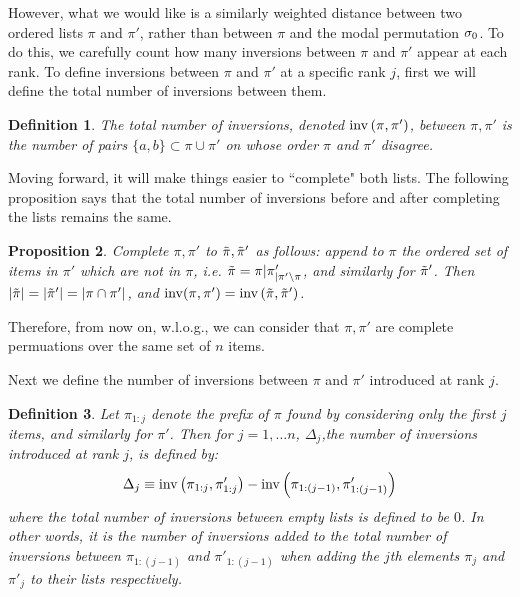 \documentclass[10pt]{article}
\newtheorem{prop}{Proposition}
\newtheorem{definition}[prop]{Definition}
\newcommand\bl{\left(}
\newcommand\br{\right)}
\begin{document}
However, what we would like is a similarly weighted distance between two ordered lists $\pi$ and $\pi'$, rather than between $\pi$ and the modal permutation $\sigma_0$. To do this, we carefully count how many inversions between $\pi$ and $\pi'$ appear at each rank. To define inversions between $\pi$ and $\pi'$ at a specific rank $j$, first we will define the total number of inversions between them.

\begin{definition}
The total number of inversions, denoted $\inv\bl \pi, \pi' \br$, between $\pi,\pi'$ is the number of pairs $\{a,b\}\subset \pi \cup \pi'$ on whose order $\pi$ and $\pi'$ disagree. 
\end{definition}

Moving forward, it will make things easier to ``complete" both lists. The following proposition says that the total number of inversions before and after completing the lists remains the same.

\begin{prop}
    Complete $\pi,\pi'$ to $\tilde{\pi},\tilde{\pi}'$ as follows: append to $\pi$ the ordered set of items in $\pi'$ which are not in $\pi$, i.e. $\tilde{\pi}=\pi|\pi'_{|\pi'\setminus\pi}$, and similarly for $\tilde{\pi}'$. Then $|\tilde{\pi}|=|\tilde{\pi}'|=|\pi \cap \pi'|$, and $\inv(\pi,\pi') = \inv \bl \tilpi,\tilpi' \br$.
\end{prop}

Therefore, from now on, w.l.o.g., we can consider that $\pi,\pi'$ are complete permuations over the same set of $n$ items.

Next we define the number of inversions between $\pi$ and $\pi'$ introduced at rank $j$. 

\begin{definition}
    Let $\pi_{1:j}$ denote the prefix of $\pi$ found by considering only the first $j$ items, and similarly for $\pi'$. Then for $j=1, \ldots n$, $\Delta_j$,the number of inversions introduced at rank $j$, is defined by:
    \begin{equation}
        \Delta_j \equiv \inv \bl \pi_{1:j},\pi'_{1:j}\br - \inv \bl \pi_{1:(j-1)},\pi'_{1:(j-1)}\br
    \end{equation}
    where the total number of inversions between empty lists is defined to be $0$.
    In other words, it is the number of inversions added to the total number of inversions between $\pi_{1:(j-1)}$ and $\pi'_{1:(j-1)}$ when adding the $j$th elements $\pi_j$ and $\pi'_j$ to their lists respectively.
\end{definition}
\end{document}
